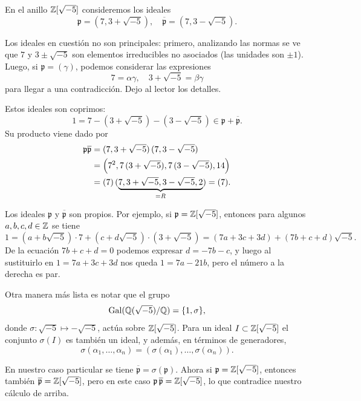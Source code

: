 \begin{ejemplo}
  En el anillo $\mathbb{Z} [\sqrt{-5}]$ consideremos los ideales
  \[ \mathfrak{p} = (7, 3 + \sqrt{-5}), \quad
     \overline{\mathfrak{p}} = (7, 3 - \sqrt{-5}). \]

  Los ideales en cuestión no son principales: primero, analizando las normas se
  ve que $7$ y $3 \pm \sqrt{-5}$ son elementos irreducibles no asociados
  (las unidades son $\pm 1$). Luego, si $\mathfrak{p} = (\gamma)$, podemos
  considerar las expresiones
  $$7 = \alpha\gamma, \quad 3 + \sqrt{-5} = \beta\gamma$$
  para llegar a una contradicción. Dejo al lector los detalles.

  Estos ideales son coprimos:
  \[ 1 = 7 - (3 + \sqrt{-5}) - (3 - \sqrt{-5})
     \in \mathfrak{p} + \overline{\mathfrak{p}}. \]
  Su producto viene dado por
  \begin{align*}
    \mathfrak{p}\overline{\mathfrak{p}} & = (7, 3+\sqrt{-5})\,(7, 3-\sqrt{-5}) \\
    & = \Bigl(7^2, 7\,(3 + \sqrt{-5}), 7\,(3 - \sqrt{-5}), 14\Bigr) \\
    & = (7)\,(\underbrace{7, 3 + \sqrt{-5}, 3 - \sqrt{-5}, 2}_{= R}) = (7).
  \end{align*}

  Los ideales $\mathfrak{p}$ y $\overline{\mathfrak{p}}$ son propios.
  Por ejemplo, si $\mathfrak{p} = \mathbb{Z} [\sqrt{-5}]$, entonces
  para algunos $a,b,c,d \in \mathbb{Z}$ se tiene
  \[ 1 = (a + b\sqrt{-5})\cdot 7 + (c + d\sqrt{-5})\cdot (3 + \sqrt{-5})
       = (7a + 3c + 3d) + (7b + c + d)\sqrt{-5}. \]
  De la ecuación $7b + c + d = 0$ podemos expresar $d = -7b-c$,
  y luego al sustituirlo en $1 = 7a + 3c + 3d$ nos queda
  $1 = 7a - 21b$, pero el número a la derecha es par.

  Otra manera más lista es notar que el grupo
  $$\operatorname{Gal} (\mathbb{Q} (\sqrt{-5})/\mathbb{Q}) = \{ 1, \sigma \},$$
  donde $\sigma\colon \sqrt{-5} \mapsto -\sqrt{-5}$, actúa sobre
  $\mathbb{Z} [\sqrt{-5}]$. Para un ideal $I \subset \mathbb{Z} [\sqrt{-5}]$
  el conjunto $\sigma (I)$ es también un ideal, y además, en términos
  de generadores,
  \[ \sigma (\alpha_1,\ldots,\alpha_n) =
     (\sigma (\alpha_1), \ldots, \sigma (\alpha_n)). \]

  En nuestro caso particular se tiene
  $\overline{\mathfrak{p}} = \sigma (\mathfrak{p})$. Ahora si
  $\mathfrak{p} = \mathbb{Z} [\sqrt{-5}]$, entonces también
  $\overline{\mathfrak{p}} = \mathbb{Z} [\sqrt{-5}]$, pero en este caso
  $\mathfrak{p}\,\overline{\mathfrak{p}} = \mathbb{Z} [\sqrt{-5}]$, lo que
  contradice nuestro cálculo de arriba.


\end{ejemplo}
